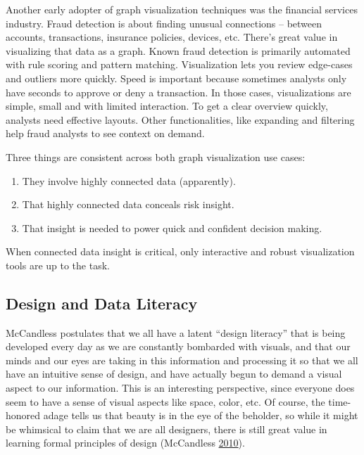 \documentclass[]{book}
\providecommand{\tightlist}{%
  \setlength{\itemsep}{0pt}\setlength{\parskip}{0pt}}
\theoremstyle{definition}
\theoremstyle{definition}
\theoremstyle{definition}
\theoremstyle{remark}
\begin{document}
Another early adopter of graph visualization techniques was the
financial services industry. Fraud detection is about finding unusual
connections -- between accounts, transactions, insurance policies,
devices, etc. There's great value in visualizing that data as a graph.
Known fraud detection is primarily automated with rule scoring and
pattern matching. Visualization lets you review edge-cases and outliers
more quickly. Speed is important because sometimes analysts only have
seconds to approve or deny a transaction. In those cases, visualizations
are simple, small and with limited interaction. To get a clear overview
quickly, analysts need effective layouts. Other functionalities, like
expanding and filtering help fraud analysts to see context on demand.

Three things are consistent across both graph visualization use cases:

\begin{enumerate}
\def\labelenumi{\arabic{enumi}.}
\tightlist
\item
  They involve highly connected data (apparently).
\item
  That highly connected data conceals risk insight.
\item
  That insight is needed to power quick and confident decision making.
\end{enumerate}

When connected data insight is critical, only interactive and robust
visualization tools are up to the task.

\subsection{Design and Data Literacy}\label{design-and-data-literacy}

McCandless postulates that we all have a latent ``design literacy'' that
is being developed every day as we are constantly bombarded with
visuals, and that our minds and our eyes are taking in this information
and processing it so that we all have an intuitive sense of design, and
have actually begun to demand a visual aspect to our information. This
is an interesting perspective, since everyone does seem to have a sense
of visual aspects like space, color, etc. Of course, the time-honored
adage tells us that beauty is in the eye of the beholder, so while it
might be whimsical to claim that we are all designers, there is still
great value in learning formal principles of design (McCandless
\protect\hyperlink{ref-viz_ted}{2010}).
\end{document}
